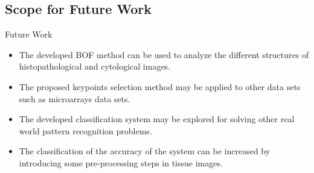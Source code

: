 \documentclass [9pt,times] {beamer}
\begin{document}
%
\subsection*{Scope for Future Work}\label{fw}
\begin{frame}{Future Work}
\fontsize{9pt}{12pt}\selectfont
\begin{itemize}
\justifying
\item The developed BOF method can be used to analyze the different structures of histopathological and cytological images.\\[3ex]
\item The proposed keypoints selection method may be applied to other data sets such as microarrays data sets.\\[3ex]
\item The developed classification system may be explored for solving other real world pattern recognition problems.\\[3ex]
\item The classification of the accuracy of the system can be increased by introducing some pre-processing steps in tissue images.
\end{itemize}
\end{frame}
\end{document}
